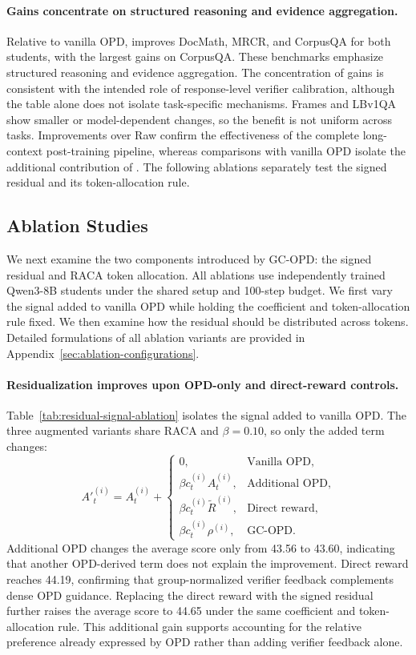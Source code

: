 \paragraph{Gains concentrate on structured reasoning and evidence aggregation.}
Relative to vanilla OPD, \method{} improves DocMath, MRCR, and CorpusQA for both students, with the largest gains on CorpusQA. These benchmarks emphasize structured reasoning and evidence aggregation. The concentration of gains is consistent with the intended role of response-level verifier calibration, although the table alone does not isolate task-specific mechanisms. Frames and LBv1QA show smaller or model-dependent changes, so the benefit is not uniform across tasks. Improvements over Raw confirm the effectiveness of the complete long-context post-training pipeline, whereas comparisons with vanilla OPD isolate the additional contribution of \method{}. The following ablations separately test the signed residual and its token-allocation rule.

\subsection{Ablation Studies}

We next examine the two components introduced by GC-OPD: the signed residual and RACA token allocation. All ablations use independently trained Qwen3-8B students under the shared setup and 100-step budget. We first vary the signal added to vanilla OPD while holding the coefficient and token-allocation rule fixed. We then examine how the residual should be distributed across tokens. Detailed formulations of all ablation variants are provided in Appendix~\ref{sec:ablation-configurations}.

\paragraph{Residualization improves upon OPD-only and direct-reward controls.}
Table~\ref{tab:residual-signal-ablation} isolates the signal added to vanilla OPD. The three augmented variants share RACA and $\beta=0.10$, so only the added term changes:
\begin{equation}
A'^{(i)}_t=A^{(i)}_t+
\begin{cases}
0, & \text{Vanilla OPD},\\
\beta c^{(i)}_t A^{(i)}_t, & \text{Additional OPD},\\
\beta c^{(i)}_t\tilde{R}^{(i)}, & \text{Direct reward},\\
\beta c^{(i)}_t\rho^{(i)}, & \text{GC-OPD}.
\end{cases}
\label{eq:signal-ablation-updates}
\end{equation}
Additional OPD changes the average score only from 43.56 to 43.60, indicating that another OPD-derived term does not explain the improvement. Direct reward reaches 44.19, confirming that group-normalized verifier feedback complements dense OPD guidance. Replacing the direct reward with the signed residual further raises the average score to 44.65 under the same coefficient and token-allocation rule. This additional gain supports accounting for the relative preference already expressed by OPD rather than adding verifier feedback alone.

